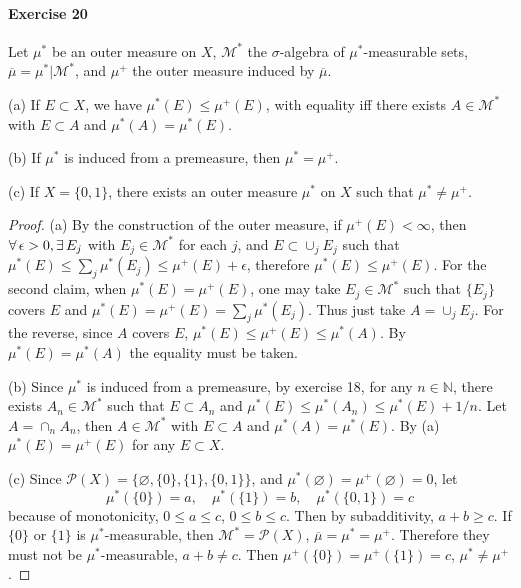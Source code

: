 \paragraph{Exercise 20}
Let $\mu^*$ be an outer measure on $X$, $\mathcal{M}^*$ the $\sigma$-algebra of $\mu^*$-measurable sets, $\overline{\mu}=\mu^*|\mathcal{M}^*$, and $\mu^+$ the outer measure induced by $\overline{\mu}$.
\par (a) If $E\subset X$, we have $\mu^*(E)\le\mu^+(E)$, with equality iff there exists $A\in\mathcal{M}^*$ with $E\subset A$ and $\mu^*(A)=\mu^*(E)$.
\par (b) If $\mu^*$ is induced from a premeasure, then $\mu^*=\mu^+$.
\par (c) If $X=\{0,1\}$, there exists an outer measure $\mu^*$ on $X$ such that $\mu^*\neq\mu^+$.
\begin{proof}
    \par (a) By the construction of the outer measure, if $\mu^+(E)<\infty$, then $\forall\,\epsilon>0, \exists\, E_j$ with $E_j\in\mathcal{M}^*$ for each $j$, and $E\subset\cup_jE_j$ such that $\mu^*(E)\le\sum_j\mu^*(E_j)\le\mu^+(E)+\epsilon$, therefore $\mu^*(E)\le\mu^+(E)$. For the second claim, when $\mu^*(E)=\mu^+(E)$, one may take $E_j\in\mathcal{M}^*$ such that $\{E_j\}$ covers $E$ and $\mu^*(E)=\mu^+(E)=\sum_j\mu^*(E_j)$. Thus just take $A=\cup_jE_j$. For the reverse, since $A$ covers $E$, $\mu^*(E)\le\mu^+(E)\le\mu^*(A)$. By $\mu^*(E)=\mu^*(A)$ the equality must be taken.
    \par (b) Since $\mu^*$ is induced from a premeasure, by exercise 18, for any $n\in\mathbb{N}$, there exists $A_n\in\mathcal{M}^*$ such that $E\subset A_n$ and $\mu^*(E)\le\mu^*(A_n)\le\mu^*(E)+1/n$. Let $A=\cap_nA_n$, then $A\in\mathcal{M}^*$ with $E\subset A$ and $\mu^*(A)=\mu^*(E)$. By (a) $\mu^*(E)=\mu^+(E)$ for any $E\subset X$.
    \par (c) Since $\mathcal{P}(X)=\{\varnothing,\{0\},\{1\},\{0,1\}\}$, and $\mu^*(\varnothing)=\mu^+(\varnothing)=0$, let 
    $$
    \mu^*(\{0\})=a,\quad \mu^*(\{1\})=b,\quad \mu^*(\{0,1\})=c
    $$
    because of monotonicity, $0\le a\le c$, $0\le b\le c$. Then by subadditivity, $a+b\ge c$. If $\{0\}$ or $\{1\}$ is $\mu^*$-measurable, then $\mathcal{M}^*=\mathcal{P}(X)$, $\overline{\mu}=\mu^*=\mu^+$. Therefore they must not be $\mu^*$-measurable, $a+b\neq c$. Then $\mu^+(\{0\})=\mu^+(\{1\})=c$, $\mu^*\neq\mu^+$.
\end{proof}
